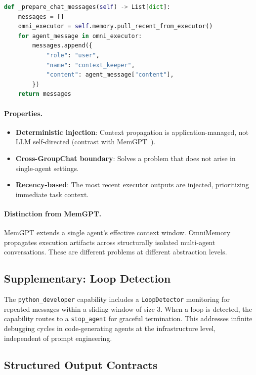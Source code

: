 \documentclass[11pt,a4paper]{article}
\begin{document}
\begin{lstlisting}[language=Python]
def _prepare_chat_messages(self) -> List[dict]:
    messages = []
    omni_executor = self.memory.pull_recent_from_executor()
    for agent_message in omni_executor:
        messages.append({
            "role": "user",
            "name": "context_keeper",
            "content": agent_message["content"],
        })
    return messages
\end{lstlisting}

\paragraph{Properties.}
\begin{itemize}[topsep=2pt, itemsep=1pt]
  \item \textbf{Deterministic injection}: Context propagation is application-managed, not LLM self-directed (contrast with MemGPT~\cite{packer2023memgpt}).
  \item \textbf{Cross-GroupChat boundary}: Solves a problem that does not arise in single-agent settings.
  \item \textbf{Recency-based}: The most recent executor outputs are injected, prioritizing immediate task context.
\end{itemize}

\paragraph{Distinction from MemGPT.} MemGPT extends a single agent's effective context window. OmniMemory propagates execution artifacts across structurally isolated multi-agent conversations. These are different problems at different abstraction levels.

\subsection{Supplementary: Loop Detection}

The \texttt{python\_developer} capability includes a \texttt{LoopDetector} monitoring for repeated messages within a sliding window of size 3. When a loop is detected, the capability routes to a \texttt{stop\_agent} for graceful termination. This addresses infinite debugging cycles in code-generating agents at the infrastructure level, independent of prompt engineering.

\subsection{Structured Output Contracts}
\end{document}
